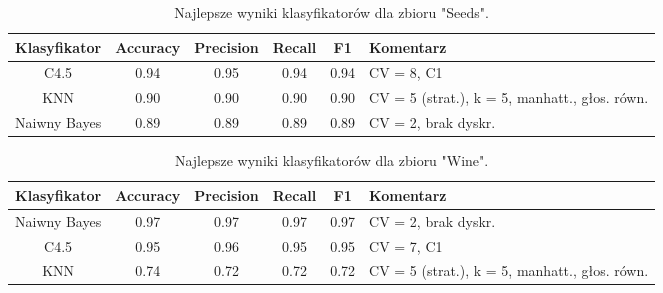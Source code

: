     \begin{table}[H]
        \center
        \begin{tabular}{|c|cccc|p{3.5cm}|}
            \hline
            Klasyfikator & Accuracy & Precision & Recall & F1     & Komentarz \\ \hline
            C4.5         & 0.94     & 0.95      & 0.94   &  0.94  &  CV = 8, C1 \\ \hline
            KNN          & 0.90     & 0.90      & 0.90   & 0.90   & CV = 5 (strat.), \linebreak k = 5, manhatt., \linebreak głos. równ. \\ \hline
            Naiwny Bayes & 0.89     & 0.89      & 0.89   &  0.89  &  CV = 2, brak dyskr. \\ \hline
        \end{tabular}
        \caption{Najlepsze wyniki klasyfikatorów dla zbioru "Seeds".}
    \end{table}

    \begin{table}[H]
        \center
        \begin{tabular}{|c|cccc|p{3.5cm}|}
            \hline
            Klasyfikator & Accuracy & Precision & Recall & F1     & Komentarz \\ \hline
            Naiwny Bayes & 0.97     & 0.97      & 0.97   & 0.97   & CV = 2, brak dyskr.\\ \hline
            C4.5         & 0.95     & 0.96      & 0.95   & 0.95   & CV = 7, C1 \\ \hline
            KNN          & 0.74     & 0.72      & 0.72   & 0.72   & CV = 5 (strat.), \linebreak k = 5, manhatt., \linebreak głos. równ. \\ \hline
        \end{tabular}
        \caption{Najlepsze wyniki klasyfikatorów dla zbioru "Wine".}
    \end{table}